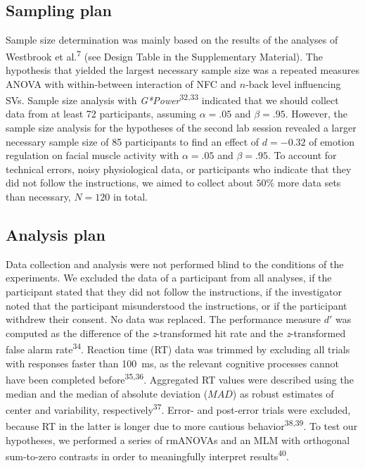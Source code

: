\documentclass[
  man,floatsintext]{apa6}
\begin{document}
\hypertarget{sampling-plan}{%
\subsection{Sampling plan}\label{sampling-plan}}

Sample size determination was mainly based on the results of the analyses of Westbrook et al.\textsuperscript{7} (see Design Table in the Supplementary Material).
The hypothesis that yielded the largest necessary sample size was a repeated measures ANOVA with within-between interaction of NFC and \(n\)-back level influencing SVs.
Sample size analysis with \emph{G*Power}\textsuperscript{32,33} indicated that we should collect data from at least 72 participants, assuming \(\alpha=.05\) and \(\beta=.95\).
However, the sample size analysis for the hypotheses of the second lab session revealed a larger necessary sample size of 85 participants to find an effect of \(d=-0.32\) of emotion regulation on facial muscle activity with \(\alpha=.05\) and \(\beta=.95\).
To account for technical errors, noisy physiological data, or participants who indicate that they did not follow the instructions, we aimed to collect about \(50\%\) more data sets than necessary, \(N=120\) in total.

\hypertarget{analysis-plan}{%
\subsection{Analysis plan}\label{analysis-plan}}

Data collection and analysis were not performed blind to the conditions of the experiments.
We excluded the data of a participant from all analyses, if the participant stated that they did not follow the instructions, if the investigator noted that the participant misunderstood the instructions, or if the participant withdrew their consent.
No data was replaced.
The performance measure \(d'\) was computed as the difference of the \emph{z}-transformed hit rate and the \emph{z}-transformed false alarm rate\textsuperscript{34}.
Reaction time (RT) data was trimmed by excluding all trials with responses faster than 100~ms, as the relevant cognitive processes cannot have been completed before\textsuperscript{35,36}.
Aggregated RT values were described using the median and the median of absolute deviation (\(MAD\)) as robust estimates of center and variability, respectively\textsuperscript{37}.
Error- and post-error trials were excluded, because RT in the latter is longer due to more cautious behavior\textsuperscript{38,39}.
To test our hypotheses, we performed a series of rmANOVAs and an MLM with orthogonal sum-to-zero contrasts in order to meaningfully interpret results\textsuperscript{40}.
\end{document}
